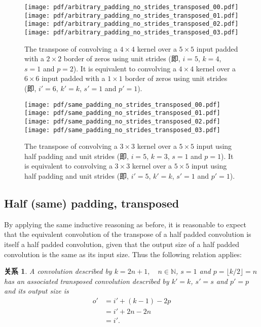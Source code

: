 \documentclass[notitlepage]{ctexrep}
\newtheorem{relationship}{关系}
\begin{document}
\begin{figure}[p]
    \centering
    \texttt{[image: pdf/arbitrary\_padding\_no\_strides\_transposed\_00.pdf]}
    \texttt{[image: pdf/arbitrary\_padding\_no\_strides\_transposed\_01.pdf]}
    \texttt{[image: pdf/arbitrary\_padding\_no\_strides\_transposed\_02.pdf]}
    \texttt{[image: pdf/arbitrary\_padding\_no\_strides\_transposed\_03.pdf]}
    \caption{\label{fig:arbitrary_padding_no_strides_transposed} The transpose
        of convolving a $4 \times 4$ kernel over a $5 \times 5$ input padded
        with a $2 \times 2$ border of zeros using unit strides (即, $i = 5$,
        $k = 4$, $s = 1$ and $p = 2$). It is equivalent to convolving a $4
        \times 4$ kernel over a $6 \times 6$ input padded with a $1 \times 1$
        border of zeros using unit strides (即, $i' = 6$, $k' = k$, $s' = 1$
        and $p' = 1$).}
\end{figure}

\begin{figure}[p]
    \centering
    \texttt{[image: pdf/same\_padding\_no\_strides\_transposed\_00.pdf]}
    \texttt{[image: pdf/same\_padding\_no\_strides\_transposed\_01.pdf]}
    \texttt{[image: pdf/same\_padding\_no\_strides\_transposed\_02.pdf]}
    \texttt{[image: pdf/same\_padding\_no\_strides\_transposed\_03.pdf]}
    \caption{\label{fig:same_padding_no_strides_transposed} The transpose of
        convolving a $3 \times 3$ kernel over a $5 \times 5$ input using half
        padding and unit strides (即, $i = 5$, $k = 3$, $s = 1$ and $p = 1$).
        It is equivalent to convolving a $3 \times 3$ kernel over a $5 \times 5$
        input using half padding and unit strides (即, $i' = 5$, $k' = k$, $s'
        = 1$ and $p' = 1$).}
\end{figure}

\subsection{Half (same) padding, transposed}

By applying the same inductive reasoning as before, it is reasonable to expect
that the equivalent convolution of the transpose of a half padded convolution
is itself a half padded convolution, given that the output size of a half
padded convolution is the same as its input size. Thus the following relation
applies:

\begin{relationship}\label{rel:half_padding_no_strides_transposed}
A convolution described by $k = 2n + 1, \quad n \in \mathbb{N}$, $s = 1$ and $p
= \lfloor k / 2 \rfloor = n$ has an associated transposed convolution described
by $k' = k$, $s' = s$ and $p' = p$ and its output size is
\begin{equation*}
\begin{split}
    o' &= i' + (k - 1) - 2p \\
       &= i' + 2n - 2n \\
       &= i'.
\end{split}
\end{equation*}
\end{relationship}
\end{document}
